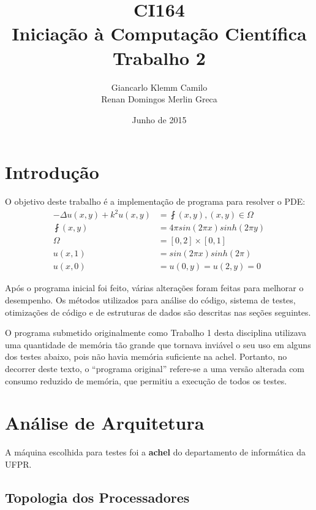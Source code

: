 \documentclass[12pt]{article}
\title{CI164\\Iniciação à Computação Científica\\Trabalho 2}
\author{
	Giancarlo Klemm Camilo \\
	Renan Domingos Merlin Greca
}
\date{Junho de 2015}
\begin{document}
\maketitle
\newpage	

\tableofcontents
\newpage

\section{Introdução}
O objetivo deste trabalho é a implementação de programa para resolver o PDE:
\begin{align*}
	- \Delta u(x,y) + k^2u(x,y) &= \fint (x,y),	(x,y) \in \Omega\\
	\fint(x,y) &= 4 \pi sin(2 \pi x) sinh(2 \pi y) \\
	\Omega &= [0,2] \times [0,1] \\
	u(x,1) &= sin(2 \pi x) sinh(2 \pi) \\
	u(x,0) &= u(0,y) = u(2,y) = 0
\end{align*}

Após o programa inicial foi feito, várias alterações foram feitas para melhorar o desempenho.
Os métodos utilizados para análise do código, sistema de testes, otimizações de código e de estruturas de dados são descritas nas seções seguintes.
	
O programa submetido originalmente como Trabalho 1 desta disciplina utilizava uma quantidade de memória tão grande que tornava inviável o seu uso em alguns dos testes abaixo, pois não havia memória suficiente na achel.
Portanto, no decorrer deste texto, o ``programa original'' refere-se a uma versão alterada com consumo reduzido de memória, que permitiu a execução de todos os testes.

\newpage

\section{Análise de Arquitetura}
A máquina escolhida para testes foi a \textbf{achel} do departamento de informática da UFPR.

\subsection{Topologia dos Processadores}
\end{document}
